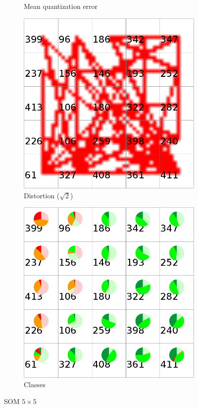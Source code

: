 \documentclass{acm_proc_article-sp}
\begin{document}
\begin{figure}
\begin{subfigure}[b]{0.45\linewidth}
    \caption{Mean quantization error}
    \label{fig:wine-small-mean-quant-error}
\end{subfigure}
\begin{subfigure}[b]{0.45\linewidth}
    \includegraphics[width=\linewidth]{img/wine-small-dist-sqrt-2}
    \caption{Distortion ($\sqrt{2}$)}
    \label{fig:wine-small-dist-sqrt-2}
\end{subfigure}
\begin{subfigure}[b]{0.45\linewidth}
\includegraphics[width=\linewidth]{img/wine-small-pie-cls}
\caption{Classes}
\label{fig:wine-small-pie-cls}
\end{subfigure}
\caption{SOM $5\times5$}
\end{figure}
\end{document}
